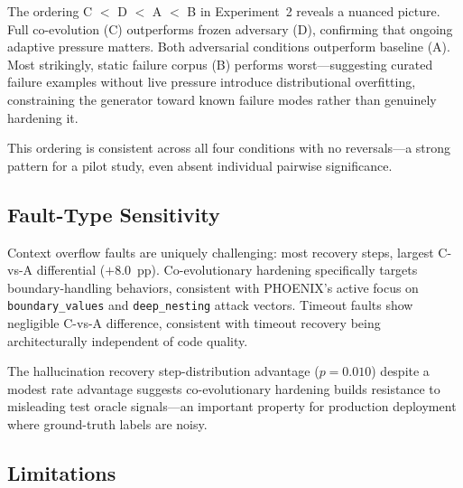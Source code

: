 \documentclass[11pt,letterpaper]{article}
\begin{document}
The ordering C $<$ D $<$ A $<$ B in Experiment~2 reveals a nuanced picture.
Full co-evolution (C) outperforms frozen adversary (D), confirming that ongoing
adaptive pressure matters. Both adversarial conditions outperform baseline (A).
Most strikingly, static failure corpus (B) performs worst---suggesting curated
failure examples without live pressure introduce distributional overfitting,
constraining the generator toward known failure modes rather than genuinely
hardening it.

This ordering is consistent across all four conditions with no reversals---a
strong pattern for a pilot study, even absent individual pairwise significance.

\subsection{Fault-Type Sensitivity}

Context overflow faults are uniquely challenging: most recovery steps, largest
C-vs-A differential ($+8.0$~pp). Co-evolutionary hardening specifically targets
boundary-handling behaviors, consistent with PHOENIX's active focus on
\texttt{boundary\_values} and \texttt{deep\_nesting} attack vectors. Timeout
faults show negligible C-vs-A difference, consistent with timeout recovery being
architecturally independent of code quality.

The hallucination recovery step-distribution advantage ($p = 0.010$) despite a
modest rate advantage suggests co-evolutionary hardening builds resistance to
misleading test oracle signals---an important property for production deployment
where ground-truth labels are noisy.

\subsection{Limitations}
\end{document}
